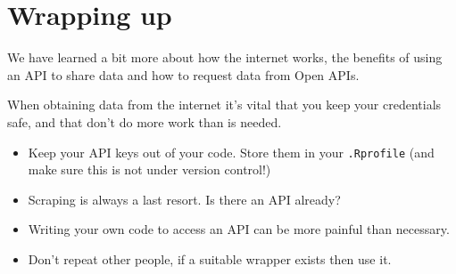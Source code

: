 \documentclass[
  12pt,
]{book}
\newenvironment{Shaded}{\begin{snugshade}}{\end{snugshade}}
\newcommand{\CommentTok}[1]{\textcolor[rgb]{0.56,0.35,0.01}{\textit{#1}}}
\begin{document}
\begin{Shaded}
\end{Shaded}

\hypertarget{wrapping-up-2}{%
\section{Wrapping up}\label{wrapping-up-2}}

We have learned a bit more about how the internet works, the benefits of using an API to share data and how to request data from Open APIs.

When obtaining data from the internet it's vital that you keep your credentials safe, and that don't do more work than is needed.

\begin{itemize}
\item
  Keep your API keys out of your code. Store them in your \texttt{.Rprofile} (and make sure this is not under version control!)
\item
  Scraping is always a last resort. Is there an API already?
\item
  Writing your own code to access an API can be more painful than necessary.
\item
  Don't repeat other people, if a suitable wrapper exists then use it.
\end{itemize}
\end{document}
